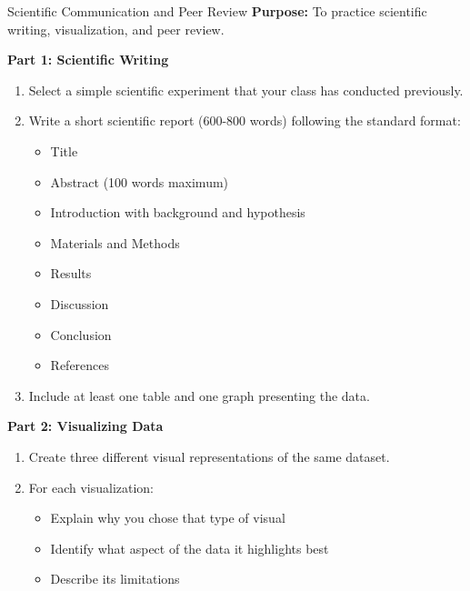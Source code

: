 \begin{investigation}{Scientific Communication and Peer Review}
\textbf{Purpose:} To practice scientific writing, visualization, and peer review.

\textbf{Part 1: Scientific Writing}
\begin{enumerate}
    \item Select a simple scientific experiment that your class has conducted previously.
    \item Write a short scientific report (600-800 words) following the standard format:
    \begin{itemize}
        \item Title
        \item Abstract (100 words maximum)
        \item Introduction with background and hypothesis
        \item Materials and Methods
        \item Results
        \item Discussion
        \item Conclusion
        \item References
    \end{itemize}
    \item Include at least one table and one graph presenting the data.
\end{enumerate}

\textbf{Part 2: Visualizing Data}
\begin{enumerate}
    \item Create three different visual representations of the same dataset.
    \item For each visualization:
    \begin{itemize}
        \item Explain why you chose that type of visual
        \item Identify what aspect of the data it highlights best
        \item Describe its limitations
    \end{itemize}
\end{enumerate}


\end{investigation}
